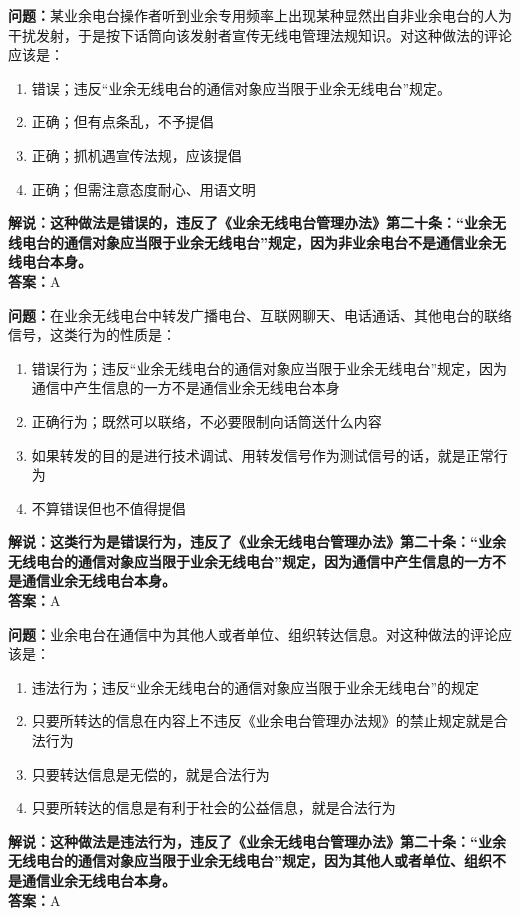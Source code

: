 \textbf{问题：}某业余电台操作者听到业余专用频率上出现某种显然出自非业余电台的人为干扰发射，于是按下话筒向该发射者宣传无线电管理法规知识。对这种做法的评论应该是：
\begin{enumerate}[label=\Alph*), leftmargin=1cm]
	\item 错误；违反“业余无线电台的通信对象应当限于业余无线电台”规定。
	\item 正确；但有点条乱，不予提倡
	\item 正确；抓机遇宣传法规，应该提倡
	\item 正确；但需注意态度耐心、用语文明
\end{enumerate}
\textbf{解说：这种做法是错误的，违反了《业余无线电台管理办法》第二十条：“业余无线电台的通信对象应当限于业余无线电台”规定，因为非业余电台不是通信业余无线电台本身。}\\\textbf{答案：}A

\textbf{问题：}在业余无线电台中转发广播电台、互联网聊天、电话通话、其他电台的联络信号，这类行为的性质是：
\begin{enumerate}[label=\Alph*), leftmargin=1cm]
	\item 错误行为；违反“业余无线电台的通信对象应当限于业余无线电台”规定，因为通信中产生信息的一方不是通信业余无线电台本身
	\item 正确行为；既然可以联络，不必要限制向话筒送什么内容
	\item 如果转发的目的是进行技术调试、用转发信号作为测试信号的话，就是正常行为
	\item 不算错误但也不值得提倡
\end{enumerate}
\textbf{解说：这类行为是错误行为，违反了《业余无线电台管理办法》第二十条：“业余无线电台的通信对象应当限于业余无线电台”规定，因为通信中产生信息的一方不是通信业余无线电台本身。}\\\textbf{答案：}A

\textbf{问题：}业余电台在通信中为其他人或者单位、组织转达信息。对这种做法的评论应该是：
\begin{enumerate}[label=\Alph*), leftmargin=1cm]
	\item 违法行为；违反“业余无线电台的通信对象应当限于业余无线电台”的规定
	\item 只要所转达的信息在内容上不违反《业余电台管理办法规》的禁止规定就是合法行为
	\item 只要转达信息是无偿的，就是合法行为
	\item 只要所转达的信息是有利于社会的公益信息，就是合法行为
\end{enumerate}
\textbf{解说：这种做法是违法行为，违反了《业余无线电台管理办法》第二十条：“业余无线电台的通信对象应当限于业余无线电台”规定，因为其他人或者单位、组织不是通信业余无线电台本身。}\\\textbf{答案：}A

